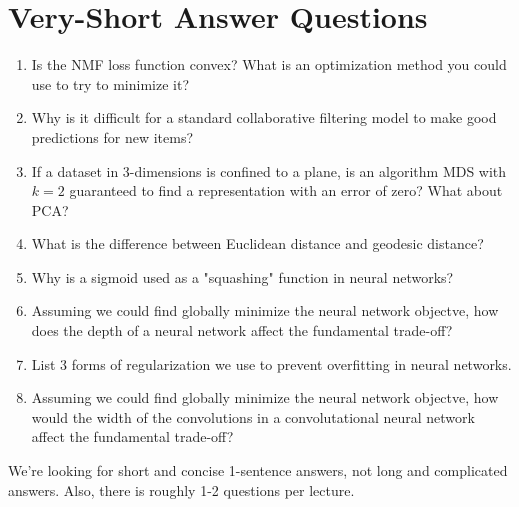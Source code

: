\documentclass{article}
\def\blu#1{{\color{blu}#1}}
\def\enum#1{\begin{enumerate}#1\end{enumerate}}
\begin{document}
\section{Very-Short Answer Questions}


\blu{
\enum{
\item Is the NMF loss function convex? What is an optimization method you could use to try to minimize it?
\item Why is it difficult for a standard collaborative filtering model  to make good predictions for new  items?
\item If a dataset in 3-dimensions is confined to a plane, is an algorithm MDS with $k=2$ guaranteed to find a representation with an error of zero? What about PCA?
\item What is the difference between Euclidean distance and geodesic distance?
\item Why is a sigmoid used as a "squashing" function in neural networks?
\item Assuming we could find globally minimize the neural network objectve, how does the depth of a neural network affect the fundamental trade-off?
\item List 3 forms of regularization we use to prevent overfitting in neural networks.
\item  Assuming we could find globally minimize the neural network objectve, how would the width of the convolutions in a convolutational neural network affect the fundamental trade-off?
}
}

We're looking for short and concise 1-sentence answers, not long and complicated answers. Also, there is roughly 1-2 questions per lecture.
\end{document}
